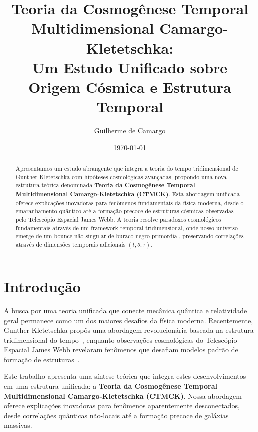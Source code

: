 \documentclass[reprint,amsmath,amssymb,aps,prd]{revtex4-2}
\begin{document}

\title{Teoria da Cosmogênese Temporal Multidimensional Camargo-Kletetschka:\\
Um Estudo Unificado sobre Origem Cósmica e Estrutura Temporal}

\author{Guilherme de Camargo}

\date{\today}

\begin{abstract}
Apresentamos um estudo abrangente que integra a teoria do tempo tridimensional de Gunther Kletetschka com hipóteses cosmológicas avançadas, propondo uma nova estrutura teórica denominada \textbf{Teoria da Cosmogênese Temporal Multidimensional Camargo-Kletetschka (CTMCK)}. Esta abordagem unificada oferece explicações inovadoras para fenômenos fundamentais da física moderna, desde o emaranhamento quântico até a formação precoce de estruturas cósmicas observadas pelo Telescópio Espacial James Webb. A teoria resolve paradoxos cosmológicos fundamentais através de um framework temporal tridimensional, onde nosso universo emerge de um bounce não-singular de buraco negro primordial, preservando correlações através de dimensões temporais adicionais $(t, \theta, \tau)$.
\end{abstract}


\maketitle

\section{Introdução}

A busca por uma teoria unificada que conecte mecânica quântica e relatividade geral permanece como um dos maiores desafios da física moderna. Recentemente, Gunther Kletetschka propôs uma abordagem revolucionária baseada na estrutura tridimensional do tempo~\cite{kletetschka2025}, enquanto observações cosmológicas do Telescópio Espacial James Webb revelaram fenômenos que desafiam modelos padrão de formação de estruturas~\cite{jwst2024}.

Este trabalho apresenta uma síntese teórica que integra estes desenvolvimentos em uma estrutura unificada: a \textbf{Teoria da Cosmogênese Temporal Multidimensional Camargo-Kletetschka (CTMCK)}. Nossa abordagem oferece explicações inovadoras para fenômenos aparentemente desconectados, desde correlações quânticas não-locais até a formação precoce de galáxias massivas.
\end{document}

